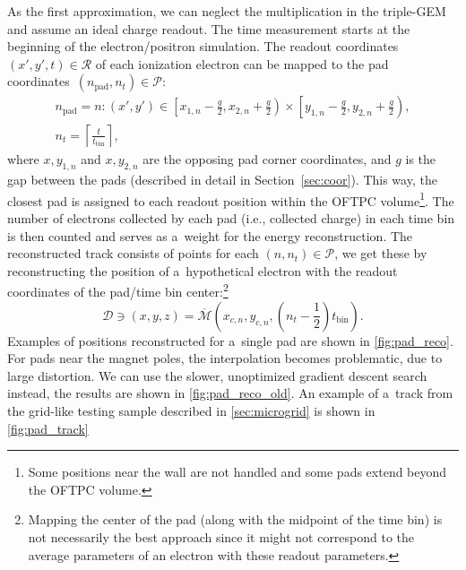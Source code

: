 		As the first approximation, we can neglect the multiplication in the triple\nobreakdash-\ac{GEM} and assume an ideal charge readout. The time measurement starts at the beginning of the electron/positron simulation. The readout coordinates ${(x',y',t)\in\mathcal{R}}$ of each ionization electron can be mapped to the pad coordinates~$(n_\text{pad},n_t) \in \mathcal{P}$:
			\begin{gather}
				n_\text{pad} = n\colon (x',y') \in \left[x_{1,n}-\frac{g}{2},x_{2,n}+\frac{g}{2}\right)\times\left[y_{1,n}-\frac{g}{2},y_{2,n}+\frac{g}{2}\right),\\
				n_t = \left\lceil \frac{t}{t_\text{bin}}\right\rceil,
			\end{gather}
		where $x,y_{1,n}$ and $x,y_{2,n}$ are the opposing pad corner coordinates, and $g$ is the gap between the pads (described in detail in Section~\ref{sec:coor}). This way, the closest pad is assigned to each readout position within the \ac{OFTPC} volume\footnote{Some positions near the wall are not handled and some pads extend beyond the \ac{OFTPC} volume.}. The number of electrons collected by each pad (i.e., collected charge) in each time bin is then counted and serves as a~weight for the energy reconstruction. The reconstructed track consists of points for each $(n,n_t)\in\mathcal{P}$, we get these by reconstructing the position of a~hypothetical electron with the readout coordinates of the pad/time bin center:\footnote{Mapping the center of the pad (along with the midpoint of the time bin) is not necessarily the best approach since it might not correspond to the average parameters of an electron with these readout parameters.}
			\begin{equation}
				\mathcal{D} \ni (x,y,z) = \overline{\mathcal{M}}\left(x_{c,n},y_{c,n},\left(n_t-\frac{1}{2}\right)t_\text{bin}\right).
			\end{equation}
		Examples of positions reconstructed for a~single pad are shown in \cref{fig:pad_reco}. For pads near the magnet poles, the interpolation becomes problematic, due to large distortion. We can use the slower, unoptimized gradient descent search instead, the results are shown in \cref{fig:pad_reco_old}. An example of a~track from the grid-like testing sample described in \cref{sec:microgrid} is shown in \cref{fig:pad_track}
		
